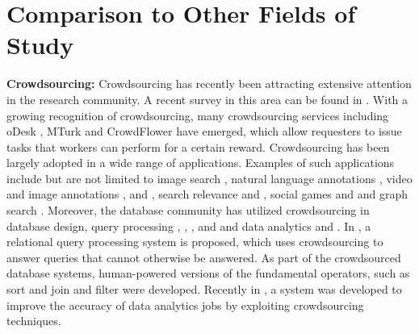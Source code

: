 \documentclass{USC-Thesis}
\numberwithin{equation}{chapter}
\begin{document}
\section{Comparison to Other Fields of Study}
\textbf{Crowdsourcing:} Crowdsourcing has recently been attracting extensive attention in the research community. A recent survey in this area can be found in \cite{kittur2013future}. With a growing recognition of crowdsourcing, many crowdsourcing services including oDesk \cite{odesk}, MTurk \cite{mturk} and CrowdFlower \cite{Crowdflower} have emerged, which allow requesters to issue tasks that workers can perform for a certain reward. Crowdsourcing has been largely adopted in a wide range of applications. Examples of such applications include but are not limited to image search \cite{yan2010crowdsearch}, natural language annotations \cite{snow2008cheap}, video and image annotations \cite{chen2009crowdsourceable}, \cite{sorokin2008utility} and \cite{whitehill2009whose}, search relevance \cite{alonso2008crowdsourcing} and \cite{bozzon2012answering}, social games \cite{von2008designing} and \cite{guy2011guess} and graph search \cite{parameswaran2011human}. Moreover, the database community has utilized crowdsourcing in database design, query processing \cite{franklin2011crowddb}, \cite{marcus2011human}, \cite{parameswaran2012crowdscreen}, \cite{demartini2013crowdq} and \cite{zhao2013crowdseed} and data analytics \cite{liu2012cdas} and \cite{wang2012crowder}. In \cite{franklin2011crowddb}, a relational query processing system is proposed, which uses crowdsourcing to answer queries that cannot otherwise be answered. As part of the crowdsourced database systems, human-powered versions of the fundamental operators, such as sort and join \cite{marcus2011human} and filter \cite{parameswaran2012crowdscreen} were developed. Recently in \cite{liu2012cdas}, a system was developed to improve the accuracy of data analytics jobs by exploiting crowdsourcing techniques.
\end{document}
